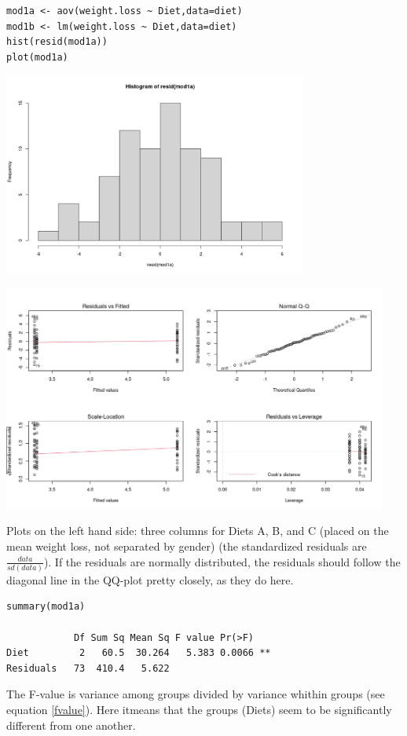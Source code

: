 \documentclass{article}
\begin{document}
\begin{lstlisting}
mod1a <- aov(weight.loss ~ Diet,data=diet)
mod1b <- lm(weight.loss ~ Diet,data=diet)
hist(resid(mod1a))
plot(mod1a)
\end{lstlisting}

\begin{center}
    \includegraphics[width = 0.75\textwidth]{lab2/hist_aov_residuals.png}
\end{center}
\begin{center}
    \includegraphics[width = 0.95\textwidth]{lab2/aov_plot.png}
\end{center}
Plots on the left hand side: three columns for Diets A, B, and C (placed on the mean weight loss, not separated by gender) (the standardized residuals are $ \frac{data}{sd(data)}$). If the residuals are normally distributed, the residuals should follow the diagonal line in the QQ-plot pretty closely, as they do here.

\begin{lstlisting}
summary(mod1a)

            Df Sum Sq Mean Sq F value Pr(>F)   
Diet         2   60.5  30.264   5.383 0.0066 **
Residuals   73  410.4   5.622                  
\end{lstlisting}
The F-value is variance among groups divided by variance whithin groups (see equation \ref{fvalue}). Here itmeans that the groups (Diets) seem to be significantly different from one another.
\end{document}
